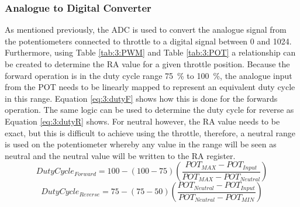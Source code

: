 	\subsubsection{Analogue to Digital Converter}
	As mentioned previously, the ADC is used to convert the analogue signal from the potentiometers connected to throttle to a digital signal between 0 and 1024. Furthermore, using Table \ref{tab:3:PWM} and Table \ref{tab:3:POT} a relationship can be created to determine the RA value for a given throttle position. Because the forward operation is in the duty cycle range \SI{75}{\percent} to \SI{100}{\percent}, the analogue input from the POT needs to be linearly mapped to represent an equivalent duty cycle in this range. Equation \ref{eq:3:dutyF} shows how this is done for the forwards operation. The same logic can be used to determine the duty cycle for reverse as Equation \ref{eq:3:dutyR} shows. For neutral however, the RA value needs to be exact, but this is difficult to achieve using the throttle, therefore, a neutral range is used on the potentiometer whereby any value in the range will be seen as neutral and the neutral value will be written to the RA register. \cite{Corporation2015}
	\begin{equation}
		Duty Cycle_{Forward} = 100 - (100-75)(\frac{POT_{MAX} - POT_{Input}}{POT_{MAX} - POT_{Neutral}})
		\label{eq:3:dutyF}
	\end{equation}
	\begin{equation}
		Duty Cycle_{Reverse} = 75 - (75-50)(\frac{POT_{Neutral} - POT_{Input}}{POT_{Neutral} - POT_{MIN}})
		\label{eq:3:dutyR}
	\end{equation}
